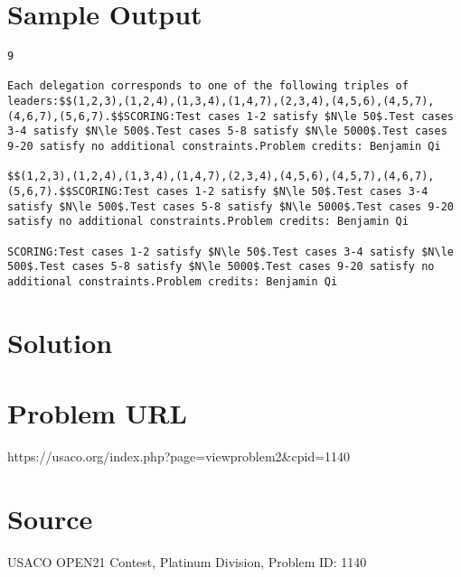 \documentclass[12pt]{article}
\begin{document}
\section*{Sample Output}
\begin{verbatim}
9

Each delegation corresponds to one of the following triples of leaders:$$(1,2,3),(1,2,4),(1,3,4),(1,4,7),(2,3,4),(4,5,6),(4,5,7),(4,6,7),(5,6,7).$$SCORING:Test cases 1-2 satisfy $N\le 50$.Test cases 3-4 satisfy $N\le 500$.Test cases 5-8 satisfy $N\le 5000$.Test cases 9-20 satisfy no additional constraints.Problem credits: Benjamin Qi

$$(1,2,3),(1,2,4),(1,3,4),(1,4,7),(2,3,4),(4,5,6),(4,5,7),(4,6,7),(5,6,7).$$SCORING:Test cases 1-2 satisfy $N\le 50$.Test cases 3-4 satisfy $N\le 500$.Test cases 5-8 satisfy $N\le 5000$.Test cases 9-20 satisfy no additional constraints.Problem credits: Benjamin Qi

SCORING:Test cases 1-2 satisfy $N\le 50$.Test cases 3-4 satisfy $N\le 500$.Test cases 5-8 satisfy $N\le 5000$.Test cases 9-20 satisfy no additional constraints.Problem credits: Benjamin Qi
\end{verbatim}

\section*{Solution}


\section*{Problem URL}
https://usaco.org/index.php?page=viewproblem2&cpid=1140

\section*{Source}
USACO OPEN21 Contest, Platinum Division, Problem ID: 1140
\end{document}
